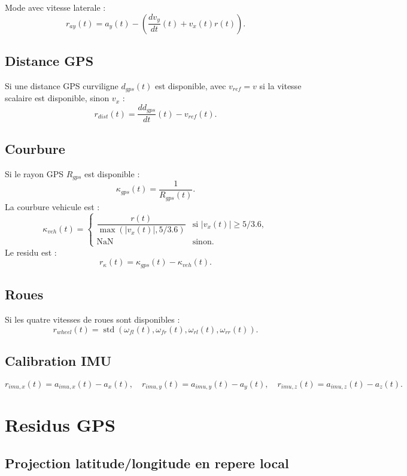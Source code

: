 \documentclass[11pt,a4paper]{article}
\begin{document}
Mode avec vitesse laterale :
\[
  r_{ay}(t)=a_y(t)-\left(\frac{d v_y}{dt}(t)+v_x(t)r(t)\right).
\]

\subsection{Distance GPS}

Si une distance GPS curviligne $d_{gps}(t)$ est disponible, avec $v_{ref}=v$ si la vitesse scalaire est disponible, sinon $v_x$ :
\[
  r_{dist}(t)=\frac{d d_{gps}}{dt}(t)-v_{ref}(t).
\]

\subsection{Courbure}

Si le rayon GPS $R_{gps}$ est disponible :
\[
  \kappa_{gps}(t)=\frac{1}{R_{gps}(t)}.
\]
La courbure vehicule est :
\[
  \kappa_{veh}(t)=
  \begin{cases}
    \dfrac{r(t)}{\max(|v_x(t)|,5/3.6)} & \text{si } |v_x(t)|\ge 5/3.6,\\
    \mathrm{NaN} & \text{sinon.}
  \end{cases}
\]
Le residu est :
\[
  r_{\kappa}(t)=\kappa_{gps}(t)-\kappa_{veh}(t).
\]

\subsection{Roues}

Si les quatre vitesses de roues sont disponibles :
\[
  r_{wheel}(t)=\operatorname{std}\left(
  \omega_{fl}(t),\omega_{fr}(t),\omega_{rl}(t),\omega_{rr}(t)
  \right).
\]

\subsection{Calibration IMU}

\[
  r_{imu,x}(t)=a_{imu,x}(t)-a_x(t),
  \quad
  r_{imu,y}(t)=a_{imu,y}(t)-a_y(t),
  \quad
  r_{imu,z}(t)=a_{imu,z}(t)-a_z(t).
\]

\section{Residus GPS}

\subsection{Projection latitude/longitude en repere local}
\end{document}
